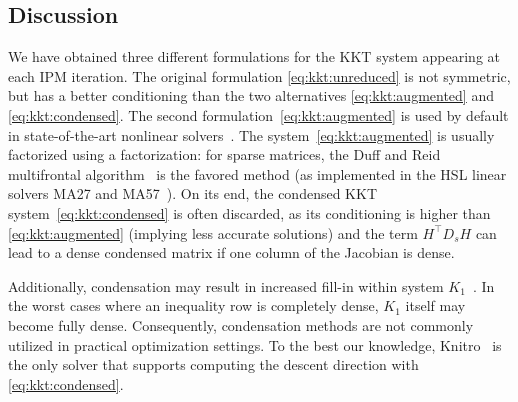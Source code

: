 \subsection{Discussion}

We have obtained three different formulations for the KKT system
appearing at each IPM iteration.
The original formulation \eqref{eq:kkt:unreduced} is not symmetric, but
has a better conditioning than the two alternatives \eqref{eq:kkt:augmented}
and \eqref{eq:kkt:condensed}.
The second formulation~\eqref{eq:kkt:augmented} is
used by default in state-of-the-art nonlinear solvers~\cite{wachter2006implementation,waltz2006interior}.
The system~\eqref{eq:kkt:augmented} is usually factorized using a \lblt factorization: for sparse matrices, the Duff and Reid
multifrontal algorithm~\cite{duff1983multifrontal} is the favored method (as implemented in the HSL linear solvers MA27 and MA57~\cite{duff2004ma57}).
On its end, the condensed KKT system~\eqref{eq:kkt:condensed} is often discarded,
as its conditioning is higher
than \eqref{eq:kkt:augmented} (implying less accurate solutions)
and the term $H^\top D_s H$ can lead to a dense condensed matrix if one column
of the Jacobian is dense.

Additionally, condensation may result in increased fill-in within system $K_1$~\cite[Section 19.3, p.571]{nocedal_numerical_2006}.
In the worst cases where an inequality row is completely dense, $K_1$ itself may become fully dense.
Consequently, condensation methods are not commonly utilized in practical optimization settings.
To the best our knowledge, Knitro~\cite{waltz2006interior} is the only solver that supports computing the descent direction with \eqref{eq:kkt:condensed}.
